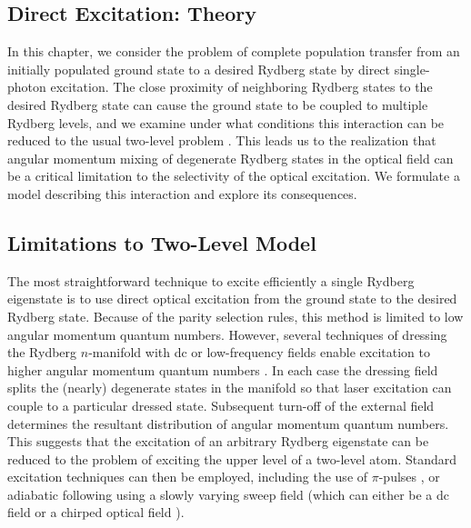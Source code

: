 

\begin{singlespace}

\chapter{Direct Excitation: Theory}
\label{direct}
\begpagestyle

\end{singlespace}

In this chapter, we consider the problem of complete
population transfer from an initially populated ground state to a desired
Rydberg state by direct single-photon excitation. The close proximity of
neighboring Rydberg states to the desired Rydberg state can cause the ground
state to be coupled to multiple Rydberg levels, and we examine under what
conditions this interaction can be reduced to the usual two-level problem
\cite{Allen:87}.  This leads us to the realization that angular momentum
mixing of degenerate Rydberg states in the optical field can be a critical
limitation to the selectivity of the optical excitation.  We formulate a
model describing this interaction and explore its consequences.

\section{Limitations to Two-Level Model}

\hspace{\parindent} The most straightforward technique to excite efficiently
a single Rydberg eigenstate is to use direct optical excitation from the
ground state to the desired Rydberg state.  Because of the parity selection
rules, this method is limited to low angular momentum quantum numbers.
However, several techniques of dressing the Rydberg $n$-manifold with dc or
low-frequency fields enable excitation to higher angular momentum quantum
numbers \cite{Hulet:83,Molander:86}.  In each case the dressing field splits
the (nearly) degenerate states in the manifold so that laser excitation can
couple to a particular dressed state.  Subsequent turn-off of the external
field determines the resultant distribution of angular momentum quantum
numbers.  This suggests that the excitation of an arbitrary Rydberg
eigenstate can be reduced to the problem of exciting the upper level of a
two-level atom.  Standard excitation techniques can then be employed,
including the use of $\pi$-pulses \cite{Allen:87}, or adiabatic following
using a slowly varying sweep field (which can either be a dc field
\cite{Loy:74} or a chirped optical field \cite{Melinger:92}).

